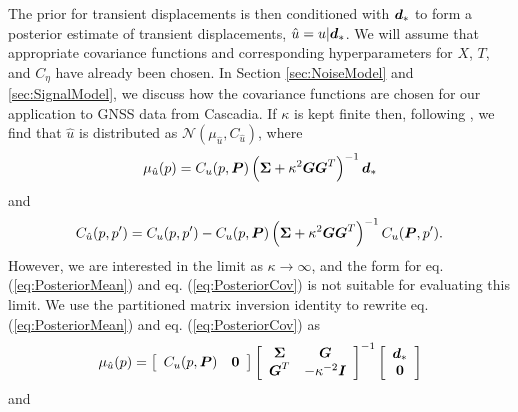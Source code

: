 \documentclass[extra,mreferee]{gji}
\begin{document}
The prior for transient displacements is then conditioned with $\mitbf{d}_*$ to form a posterior estimate of transient displacements, $\hat{u} = u | \mitbf{d}_*$. We will assume that appropriate covariance functions and corresponding hyperparameters for $X$, $T$, and $C_\eta$ have already been chosen. In Section \ref{sec:NoiseModel} and \ref{sec:SignalModel}, we discuss how the covariance functions are chosen for our application to GNSS data from Cascadia. If $\kappa$ is kept finite then, following \citet{Rasmussen2006}, we find that $\hat{u}$ is distributed as $\mathcal{N}(\mu_{\hat{u}},C_{\hat{u}})$, where
\begin{equation}\label{eq:PosteriorMean}
\mu_{\hat{u}}(p) = C_u(p,\mitbf{P})\left(\mitbf{\Sigma} + \kappa^2\mitbf{G}\mitbf{G}^T\right)^{-1}\mitbf{d}_*
\end{equation}    
and
\begin{equation}\label{eq:PosteriorCov}
C_{\hat{u}}(p,p') = C_u(p,p') - C_u(p,\mitbf{P})\left(\mitbf{\Sigma} + \kappa^2\mitbf{G}\mitbf{G}^T\right)^{-1}C_u(\mitbf{P},p').
\end{equation}
However, we are interested in the limit as $\kappa \to \infty$, and the form for eq. (\ref{eq:PosteriorMean}) and eq. (\ref{eq:PosteriorCov}) is not suitable for evaluating this limit. We use the partitioned matrix inversion identity \citep[e.g.,][]{Press2007} to rewrite eq. (\ref{eq:PosteriorMean}) and eq. (\ref{eq:PosteriorCov}) as
 \begin{equation}\label{eq:PosteriorMean2}
\mu_{\hat{u}}(p) = \left[\begin{array}{cc}
                         C_u(p,\mitbf{P}) & \mitbf{0} \\
                         \end{array}\right]
                   \left[\begin{array}{cc}
                         \mitbf{\Sigma} & \mitbf{G} \\
                         \mitbf{G}^T  & -\kappa^{-2} \mitbf{I} \\
                         \end{array}\right]^{-1}
                   \left[\begin{array}{c}
                         \mitbf{d}_* \\
                         \mitbf{0} \\
                         \end{array}\right]
\end{equation}    
and
\end{document}

